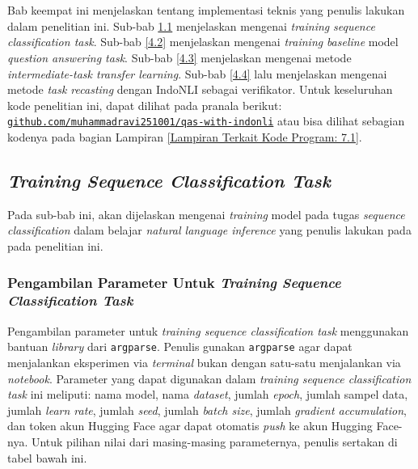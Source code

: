 \chapter{\babEmpat}
\label{bab:4}
Bab keempat ini menjelaskan tentang implementasi teknis yang penulis lakukan dalam penelitian ini. Sub-bab \ref{4.1} menjelaskan mengenai \emph{training} \emph{sequence classification task}. Sub-bab \ref{4.2} menjelaskan mengenai  \emph{training} \emph{baseline} model \emph{question answering task}. Sub-bab \ref{4.3} menjelaskan mengenai metode \emph{intermediate-task transfer learning}. Sub-bab \ref{4.4} lalu menjelaskan mengenai metode \emph{task recasting} dengan IndoNLI sebagai verifikator. Untuk keseluruhan kode penelitian ini, dapat dilihat pada pranala berikut: \href{https://github.com/muhammadravi251001/qas-with-indonli/}{\texttt{github.com/muhammadravi251001/qas-with-indonli}} atau bisa dilihat sebagian kodenya pada bagian Lampiran \ref{Lampiran Terkait Kode Program: 7.1}.

\section{\emph{Training} \emph{Sequence Classification Task}}
\label{4.1}
Pada sub-bab ini, akan dijelaskan mengenai \emph{training} model pada tugas \emph{sequence classification} dalam belajar \emph{natural language inference} yang penulis lakukan pada pada penelitian ini. 

\subsection{Pengambilan Parameter Untuk \emph{Training Sequence Classification Task}}
\label{4.1.1}
Pengambilan parameter untuk \emph{training sequence classification task} menggunakan bantuan \emph{library} dari \texttt{argparse}. Penulis gunakan \texttt{argparse} agar dapat menjalankan eksperimen via \emph{terminal} bukan dengan satu-satu menjalankan via \emph{notebook}. Parameter yang dapat digunakan dalam \emph{training sequence classification task} ini meliputi: nama model, nama \emph{dataset}, jumlah \emph{epoch}, jumlah sampel data, jumlah \emph{learn rate}, jumlah \emph{seed}, jumlah \emph{batch size}, jumlah \emph{gradient accumulation}, dan token akun Hugging Face agar dapat otomatis \emph{push} ke akun Hugging Face-nya. Untuk pilihan nilai dari masing-masing parameternya, penulis sertakan di tabel bawah ini.

